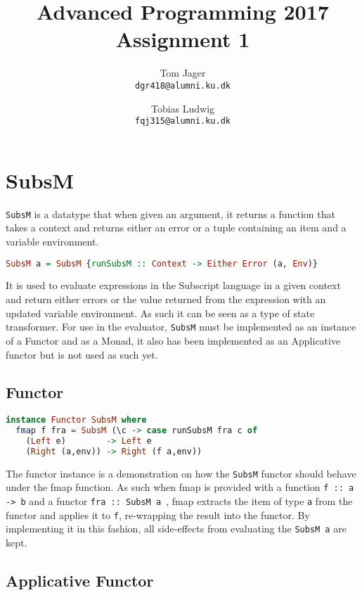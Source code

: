 \documentclass{article}
\title{Advanced Programming 2017\\Assignment 1}
\author{
Tom Jager\\
\texttt{dgr418@alumni.ku.dk}
\and
Tobias Ludwig\\
\texttt{fqj315@alumni.ku.dk}}
\begin{document}
\maketitle
 
\section{SubsM \textellipsis}
\texttt{SubsM} is a datatype that when given an argument, it returns a function that takes a context and returns either an error or a tuple containing an item and a variable environment.

\begin{lstlisting}[language=Haskell]
SubsM a = SubsM {runSubsM :: Context -> Either Error (a, Env)}
\end{lstlisting}

It is used to evaluate expressions in the Subscript language in a given context and return either errors or the value returned from the expression with an updated variable environment. As such it can be seen as a type of state transformer. For use in the evaluator, \texttt{SubsM} must be implemented as an instance of a Functor and as a Monad, it also has been implemented as an Applicative functor but is not used as such yet. 

\subsection{Functor}

\begin{lstlisting}[language=Haskell]
instance Functor SubsM where
  fmap f fra = SubsM (\c -> case runSubsM fra c of
    (Left e)        -> Left e
    (Right (a,env)) -> Right (f a,env))
\end{lstlisting}

The functor instance is a demonstration on how the \texttt{SubsM} functor should behave under the fmap function. As such when fmap is provided with a function \texttt{f :: a -> b} and a functor \texttt{fra :: SubsM a }, fmap extracts the item of type \texttt{a} from the functor and applies it to \texttt{f}, re-wrapping the result into the functor. By implementing it in this fashion, all side-effects from evaluating the \texttt{SubsM a} are kept.

\subsection{Applicative Functor}
\end{document}
